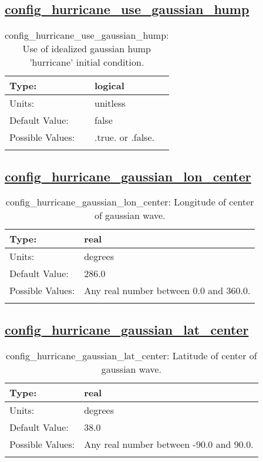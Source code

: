 \subsection[config\_hurricane\_use\_gaussian\_hump]{\hyperref[sec:nm_tab_hurricane]{config\_hurricane\_use\_gaussian\_hump}}
\label{subsec:nm_sec_config_hurricane_use_gaussian_hump}
\begin{center}
\begin{longtable}{| p{2.0in} || p{4.0in} |}
    \hline
    Type: & logical \\
    \hline
    Units: & \si{unitless} \\
    \hline
    Default Value: & false \\
    \hline
    Possible Values: & .true. or .false. \\
    \hline
    \caption{config\_hurricane\_use\_gaussian\_hump: Use of idealized gaussian hump 'hurricane' initial condition.}
\end{longtable}
\end{center}
\subsection[config\_hurricane\_gaussian\_lon\_center]{\hyperref[sec:nm_tab_hurricane]{config\_hurricane\_gaussian\_lon\_center}}
\label{subsec:nm_sec_config_hurricane_gaussian_lon_center}
\begin{center}
\begin{longtable}{| p{2.0in} || p{4.0in} |}
    \hline
    Type: & real \\
    \hline
    Units: & \si{degrees} \\
    \hline
    Default Value: & 286.0 \\
    \hline
    Possible Values: & Any real number between 0.0 and 360.0. \\
    \hline
    \caption{config\_hurricane\_gaussian\_lon\_center: Longitude of center of gaussian wave.}
\end{longtable}
\end{center}
\subsection[config\_hurricane\_gaussian\_lat\_center]{\hyperref[sec:nm_tab_hurricane]{config\_hurricane\_gaussian\_lat\_center}}
\label{subsec:nm_sec_config_hurricane_gaussian_lat_center}
\begin{center}
\begin{longtable}{| p{2.0in} || p{4.0in} |}
    \hline
    Type: & real \\
    \hline
    Units: & \si{degrees} \\
    \hline
    Default Value: & 38.0 \\
    \hline
    Possible Values: & Any real number between -90.0 and 90.0. \\
    \hline
    \caption{config\_hurricane\_gaussian\_lat\_center: Latitude of center of gaussian wave.}
\end{longtable}
\end{center}
